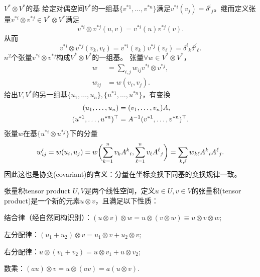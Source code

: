 \begin{example}{$V^\ast \otimes V^\ast$的基}{}
	给定对偶空间$V^\ast$的一组基$\{v^{\ast 1},\ldots,v^{\ast n}\}$满足$v^{\ast i}(v_j) = \delta^i{}_j$。继而定义张量$v^{\ast i} \otimes v^{\ast j} \in V^\ast \otimes V^\ast$满足
	\begin{equation}\label{eq:la-tensor-product-of-functionals}
		v^{\ast i} \otimes v^{\ast j}(u,v) = v^{\ast i}(u)v^{\ast j}(v).
	\end{equation}
	从而
	\[
		v^{\ast i} \otimes v^{\ast j}(v_k,v_\ell) = v^{\ast i}(v_k)v^{\ast j}(v_\ell) = \delta^i{}_k\delta^j{}_\ell.
	\]
	$n^2$个张量$v^{\ast i} \otimes v^{\ast j}$构成$V^\ast \otimes V^\ast$的一组基。
	\tcblower
	张量$\forall w \in V^\ast \otimes V^\ast$，
	\begin{subequations}\label{eq:la-covariant-tensor-components}
		\begin{align}
			w &= \sum_{i,j}w_{ij}v^{\ast i} \otimes v^{\ast j},\\
			w_{ij} &= w(v_i,v_j).
		\end{align}
	\end{subequations}
	给出$V,V^\ast$的另一组基$\{u_1,\ldots,u_n\},\{u^{\ast 1},\ldots,u^{\ast n}\}$，有变换
	\begin{subequations}\label{eq:la-dual-basis-change}
		\begin{align}
			(u_1,\ldots,u_n) &= (v_1,\ldots,v_n)A,\\
			(u^{\ast 1},\ldots,u^{\ast n})^\top &= A^{-1}(v^{\ast 1},\ldots,v^{\ast n})^\top.
		\end{align}
	\end{subequations}
	张量$w$在基$\{u^{\ast i} \otimes u^{\ast j}\}$下的分量
	\begin{equation}\label{eq:la-covariant-component-change}
		w'_{ij} = w(u_i,u_j) = w\biggl(\sum_{k=1}^nv_kA^k{}_i,\sum_{\ell=1}^nv_\ell A^\ell{}_j\biggr) = \sum_{k,\ell}w_{k\ell}A^k{}_iA^\ell{}_j.
	\end{equation}
	因此这也是协变(covariant)的含义：分量在坐标变换下同基的变换规律一致。
\end{example}
\begin{definition}{张量积}{tensor product}
	$U,V$是两个线性空间，定义$u \in U,v \in V$的张量积(tensor product)是一个新的元素$u \otimes v$，且满足以下性质：
	\begin{compactitem}
		\item 结合律（经自然同构识别）：$(u \otimes v) \otimes w = u \otimes (v \otimes w) \equiv u \otimes v \otimes w;$
		\item 左分配律：$(u_1 + u_2) \otimes v = u_1 \otimes v + u_2 \otimes v;$
		\item 右分配律：$u \otimes (v_1 + v_2) = u \otimes v_1 + u \otimes v_2;$
		\item 数乘：$(au) \otimes v = u \otimes (av) = a(u \otimes v).$
	\end{compactitem}
\end{definition}

